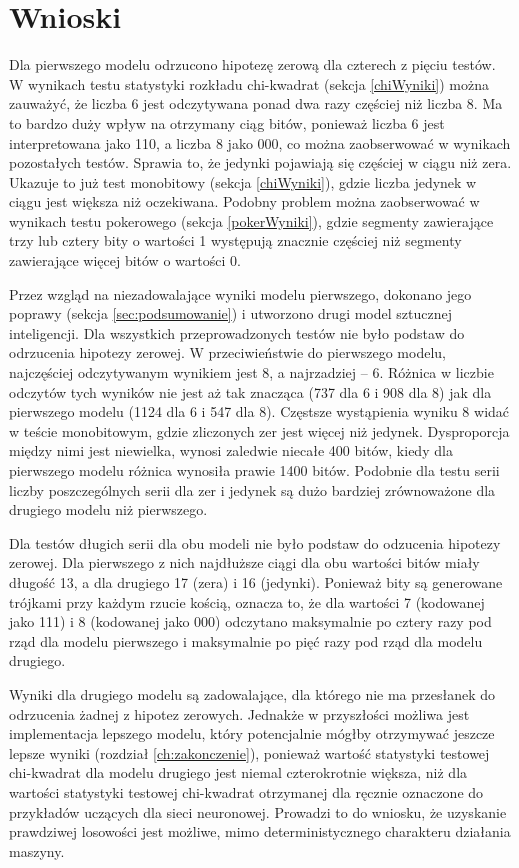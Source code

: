 \section{Wnioski}
Dla pierwszego modelu odrzucono hipotezę zerową dla czterech z pięciu testów. W wynikach testu statystyki 
rozkładu chi-kwadrat (sekcja \ref{chiWyniki}) można zauważyć, że liczba 6 jest odczytywana ponad dwa razy częściej niż 
liczba 8. Ma to bardzo duży wpływ na otrzymany ciąg bitów, ponieważ liczba 6 jest interpretowana jako 110, a 
liczba 8 jako 000, co można zaobserwować w wynikach pozostałych testów. Sprawia to, że jedynki pojawiają się 
częściej w ciągu niż zera. Ukazuje to już test monobitowy (sekcja \ref{chiWyniki}), gdzie liczba jedynek w ciągu jest 
większa niż oczekiwana. Podobny problem można zaobserwować w wynikach testu pokerowego (sekcja \ref{pokerWyniki}), 
gdzie segmenty zawierające trzy lub cztery bity o wartości 1 występują znacznie częściej niż segmenty zawierające 
więcej bitów o wartości 0. 

Przez wzgląd na niezadowalające wyniki modelu pierwszego, dokonano jego poprawy (sekcja \ref{sec:podsumowanie}) i
utworzono drugi model sztucznej inteligencji. Dla wszystkich przeprowadzonych testów nie było podstaw do odrzucenia
hipotezy zerowej. W przeciwieństwie do pierwszego modelu, najczęściej odczytywanym wynikiem jest 8, a najrzadziej -- 6.
Różnica w liczbie odczytów tych wyników nie jest aż tak znacząca (737 dla 6 i 908 dla 8) jak dla pierwszego modelu 
(1124 dla 6 i 547 dla 8). Częstsze wystąpienia wyniku 8 widać w teście monobitowym, gdzie zliczonych zer jest więcej
niż jedynek. Dysproporcja między nimi jest niewielka, wynosi zaledwie niecałe 400 bitów, kiedy dla pierwszego modelu
różnica wynosiła prawie 1400 bitów. Podobnie dla testu serii liczby poszczególnych serii dla zer i jedynek są dużo
bardziej zrównoważone dla drugiego modelu niż pierwszego. 

Dla testów długich serii dla obu modeli nie było podstaw do odzucenia hipotezy zerowej. Dla pierwszego z nich najdłuższe
ciągi dla obu wartości bitów miały długość 13, a dla drugiego 17 (zera) i 16 (jedynki). Ponieważ bity są generowane 
trójkami przy każdym rzucie kością, oznacza to, że dla wartości 7 (kodowanej jako 111) i 8 (kodowanej jako 000)
odczytano maksymalnie po cztery razy pod rząd dla modelu pierwszego i maksymalnie po pięć razy pod rząd dla modelu 
drugiego. 

Wyniki dla drugiego modelu są zadowalające, dla którego nie ma przesłanek do odrzucenia żadnej z hipotez zerowych.
Jednakże w przyszłości możliwa jest implementacja lepszego modelu, który
potencjalnie mógłby otrzymywać jeszcze lepsze wyniki (rozdział \ref{ch:zakonczenie}), ponieważ wartość statystyki testowej
chi-kwadrat dla modelu drugiego jest niemal czterokrotnie większa, niż dla wartości statystyki testowej chi-kwadrat 
otrzymanej dla ręcznie oznaczone do przykładów uczących dla sieci neuronowej.
Prowadzi to do wniosku, że uzyskanie prawdziwej losowości jest możliwe, mimo deterministycznego charakteru działania maszyny.
